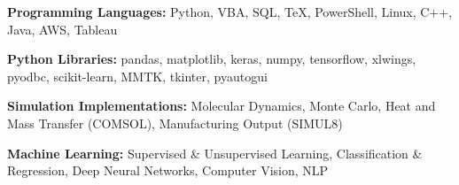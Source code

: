 

\begin{cvparagraph}


\vspace{1.0pt}

\textbf{Programming Languages:} Python, VBA, SQL, TeX, PowerShell, Linux, C++, Java, AWS, Tableau

\vspace{-4.0pt}

\textbf{Python Libraries:} pandas, matplotlib, keras, numpy, tensorflow, xlwings, pyodbc, scikit-learn, MMTK, tkinter, pyautogui

\vspace{-4.0pt}

\textbf{Simulation Implementations:} Molecular Dynamics, Monte Carlo, Heat and Mass Transfer (COMSOL), Manufacturing Output (SIMUL8)

\vspace{-4.0pt}

\textbf{Machine Learning:} Supervised \& Unsupervised Learning, Classification \& Regression, Deep Neural Networks, Computer Vision, NLP

\vspace{-10.0pt}

\end{cvparagraph}
